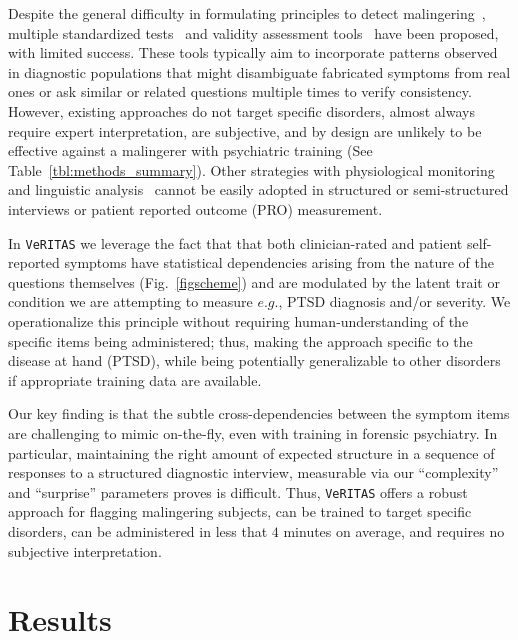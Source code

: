 \documentclass[onecolumn,10pt]{IEEEtran}
\def\vrts{\texttt{VeRITAS}\xspace}
\begin{document}


Despite the general difficulty in formulating principles to detect malingering~\cite{drob2009clinical}, multiple standardized tests~\cite{Wong2005,smith1997detection} and validity assessment tools~\cite{ben2012interpreting} have been proposed, with limited success. These tools typically aim to incorporate patterns observed in diagnostic populations that might disambiguate fabricated symptoms from real ones or ask similar or related questions multiple times to verify consistency. However,  existing approaches do not target specific disorders, almost always require expert interpretation, are  subjective, and by design are unlikely to be effective against a malingerer with psychiatric training (See Table~\ref{tbl:methods_summary}). Other  strategies with physiological monitoring and linguistic analysis~\cite{ekman1991who,mihalcea2009lie,burgoon2008cognitive,zhou2004automating}  cannot be easily adopted in structured or semi-structured interviews or patient reported outcome (PRO) measurement.

In  \vrts we leverage the fact that that both clinician-rated and patient self-reported symptoms have  statistical dependencies  arising from the nature of the questions themselves (Fig.~\ref{figscheme}) and are modulated by the latent trait or condition we are attempting to measure $e.g.$, PTSD diagnosis and/or severity. We operationalize this principle without requiring human-understanding of the specific items being administered; thus, making the approach  specific to the disease at hand (PTSD), while being potentially generalizable to other disorders if appropriate training data are available.

Our key finding is that the subtle cross-dependencies between the symptom items are challenging to  mimic on-the-fly, even with training in forensic psychiatry. In particular, maintaining the right amount of expected structure in a sequence of responses to a structured diagnostic interview, measurable  via our  ``complexity'' and ``surprise'' parameters proves is  difficult.   Thus,  \vrts offers a robust  approach for flagging malingering subjects, can be trained to target specific disorders,  can be administered in less that $4$ minutes on average, and requires   no  subjective interpretation.

\section*{Results} 
\end{document}
